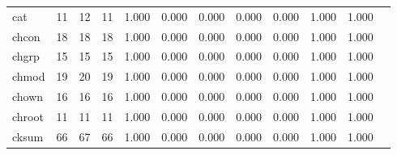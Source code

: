 \begin{longtable}{lp{1.00cm}p{1.00cm}p{1.00cm}p{1.00cm}p{1.00cm}p{1.00cm}p{1.00cm}p{1.00cm}p{1.00cm}p{1.00cm}p{1.00cm}}
cat       &                           11 &                 12 &                                11 &                                      1.000 &                                  0.000 &                                        0.000 &                             0.000 &                                   0.000 &                        1.000 &                                        1.000 \\
chcon     &                           18 &                 18 &                                18 &                                      1.000 &                                  0.000 &                                        0.000 &                             0.000 &                                   0.000 &                        1.000 &                                        1.000 \\
chgrp     &                           15 &                 15 &                                15 &                                      1.000 &                                  0.000 &                                        0.000 &                             0.000 &                                   0.000 &                        1.000 &                                        1.000 \\
chmod     &                           19 &                 20 &                                19 &                                      1.000 &                                  0.000 &                                        0.000 &                             0.000 &                                   0.000 &                        1.000 &                                        1.000 \\
chown     &                           16 &                 16 &                                16 &                                      1.000 &                                  0.000 &                                        0.000 &                             0.000 &                                   0.000 &                        1.000 &                                        1.000 \\
chroot    &                           11 &                 11 &                                11 &                                      1.000 &                                  0.000 &                                        0.000 &                             0.000 &                                   0.000 &                        1.000 &                                        1.000 \\
cksum     &                           66 &                 67 &                                66 &                                      1.000 &                                  0.000 &                                        0.000 &                             0.000 &                                   0.000 &                        1.000 &                                        1.000 \\

\end{longtable}
